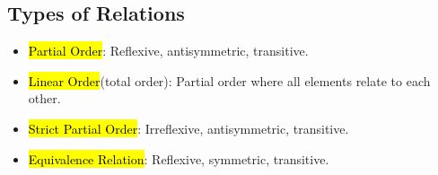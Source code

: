\subsection{Types of Relations}
\begin{itemize}
    \item \hl{Partial Order}: Reflexive, antisymmetric, transitive.
    \item \hl{Linear Order}(total order): Partial order where all elements relate to each other.
    \item \hl{Strict Partial Order}: Irreflexive, antisymmetric, transitive.
    \item \hl{Equivalence Relation}: Reflexive, symmetric, transitive.
\end{itemize}